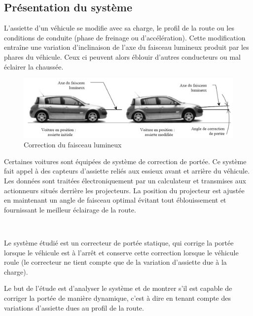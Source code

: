 \subsection{Présentation du système}

L'assiette d'un véhicule se modifie avec sa charge, le profil de la route ou les conditions de conduite (phase de freinage ou d'accélération). Cette modification entraîne une variation d'inclinaison de l'axe du faisceau lumineux produit par les phares du véhicule. Ceux ci peuvent alors éblouir d'autres conducteurs ou mal éclairer la chaussée. 

\begin{figure}[!h]
  \centering
  \includegraphics[width=0.9\linewidth]{img/phare1}
  \caption{Correction du faisceau lumineux}
  \label{phare1}
\end{figure}

Certaines voitures sont équipées de système de correction de portée. Ce système fait appel à des capteurs d'assiette reliés aux essieux avant et arrière du véhicule. Les données sont traitées électroniquement par un calculateur et transmises aux actionneurs situés derrière les projecteurs. La position du projecteur est ajustée en maintenant un angle de faisceau optimal évitant tout éblouissement et fournissant le meilleur éclairage de la route.

~\

Le système étudié est un correcteur de portée statique, qui corrige la portée lorsque le véhicule est à l'arrêt et conserve cette correction lorsque le véhicule roule (le correcteur ne tient compte que de la variation d'assiette due à la charge). 

Le but de l'étude est d'analyser le système et de montrer s'il est capable de corriger la portée de manière dynamique, c'est à dire en tenant compte des variations d'assiette dues au profil de la route.

~\

